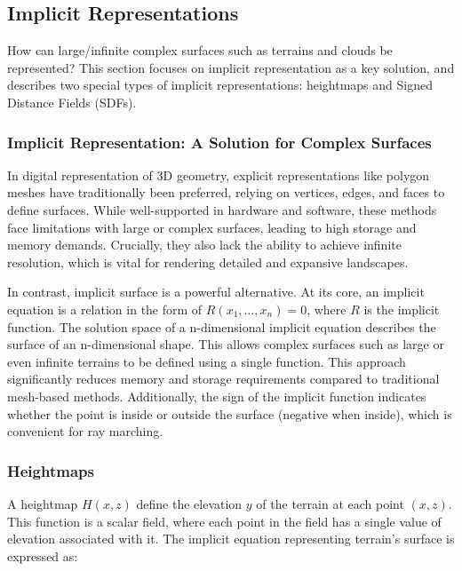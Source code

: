 \subsection{Implicit Representations}

How can large/infinite complex surfaces such as terrains and clouds be represented? This section focuses on implicit representation as a key solution, and describes two special types of  implicit representations: heightmaps and Signed Distance Fields (SDFs).


\subsubsection{Implicit Representation: A Solution for Complex Surfaces}

In digital representation of 3D geometry, explicit representations like polygon meshes have traditionally been preferred, relying on vertices, edges, and faces to define surfaces. While well-supported in hardware and software, these methods face limitations with large or complex surfaces, leading to high storage and memory demands. Crucially, they also lack the ability to achieve infinite resolution, which is vital for rendering detailed and expansive landscapes.

In contrast, implicit surface is a powerful alternative. At its core, an implicit equation is a relation in the form of $R(x_1,\dots,x_n)=0$, where $R$ is the implicit function. The solution space of a n-dimensional implicit equation describes the surface of an n-dimensional shape. This allows complex surfaces such as large or even infinite terrains to be defined using a single function. This approach significantly reduces memory and storage requirements compared to traditional mesh-based methods. Additionally, the sign of the implicit function indicates whether the point is inside or outside the surface (negative when inside), which is convenient for ray marching.

\subsubsection{Heightmaps}
\label{Heightmap}

A heightmap $H(x,z)$ define the elevation $y$ of the terrain at each point $(x,z)$. This function is a scalar field, where each point in the field has a single value of elevation associated with it. The implicit equation representing terrain's surface is expressed as:

